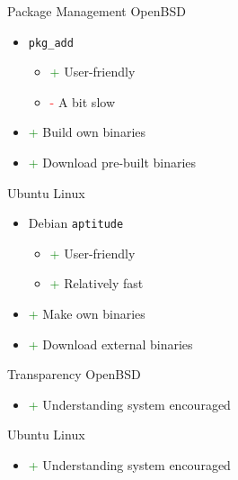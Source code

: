 \documentclass{beamer}
\newcommand{\good}{\textcolor{green}{+ }}
\newcommand{\bad}{\textcolor{red}{- }}
\begin{document}
			\begin{frame}{Package Management}
				OpenBSD
				\begin{itemize}
					\item \texttt{pkg\_add}
					\begin{itemize}
						\item \good User-friendly
						\item \bad A bit slow
					\end{itemize}
					\item \good Build own binaries
					\item \good Download pre-built binaries
				\end{itemize}
				Ubuntu Linux
				\begin{itemize}
					\item Debian \texttt{aptitude}
					\begin{itemize}
						\item \good User-friendly
						\item \good Relatively fast
					\end{itemize}
					\item \good Make own binaries
					\item \good Download external binaries
				\end{itemize}
			\end{frame}
			\begin{frame}{Transparency}
				OpenBSD
				\begin{itemize}
					\item \good Understanding system encouraged
				\end{itemize}
				Ubuntu Linux
				\begin{itemize}
					\item \good Understanding system encouraged
				\end{itemize}
			\end{frame}
\end{document}
